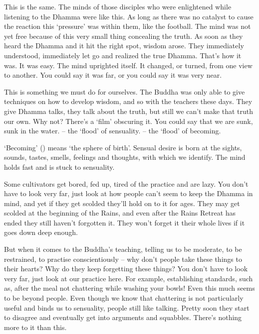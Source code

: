 This is the same. The minds of those disciples who were enlightened while listening to the Dhamma were like this. As long as there was no catalyst to cause the reaction this `pressure' was within them, like the football. The mind was not yet free because of this very small thing concealing the truth. As soon as they heard the Dhamma and it hit the right spot, wisdom arose. They immediately understood, immediately let go and realized the true Dhamma. That's how it was. It was easy. The mind uprighted itself. It changed, or turned, from one view to another. You could say it was far, or you could say it was very near.

This is something we must do for ourselves. The Buddha was only able to give techniques on how to develop wisdom, and so with the teachers these days. They give Dhamma talks, they talk about the truth, but still we can't make that truth our own. Why not? There's a `film' obscuring it. You could say that we are sunk, sunk in the water.  -- the `flood' of sensuality.  -- the `flood' of becoming.

`Becoming' () means `the sphere of birth'. Sensual desire is born at the sights, sounds, tastes, smells, feelings and thoughts, with which we identify. The mind holds fast and is stuck to sensuality.

Some cultivators get bored, fed up, tired of the practice and are lazy. You don't have to look very far, just look at how people can't seem to keep the Dhamma in mind, and yet if they get scolded they'll hold on to it for ages. They may get scolded at the beginning of the Rains, and even after the Rains Retreat has ended they still haven't forgotten it. They won't forget it their whole lives if it goes down deep enough.

But when it comes to the Buddha's teaching, telling us to be moderate, to be restrained, to practise conscientiously -- why don't people take these things to their hearts? Why do they keep forgetting these things? You don't have to look very far, just look at our practice here. For example, establishing standards, such as, after the meal not chattering while washing your bowls! Even this much seems to be beyond people. Even though we know that chattering is not particularly useful and binds us to sensuality, people still like talking. Pretty soon they start to disagree and eventually get into arguments and squabbles. There's nothing more to it than this.

